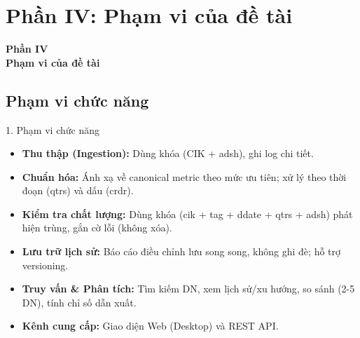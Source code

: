 \documentclass[t, aspectratio=169]{beamer} %
\begin{document}
	\useStyleLogoOnly 
	\useThickBar      
	
	\section{Phần IV: Phạm vi của đề tài}
	\begin{frame}
		\vfill
		\centering
		{\Huge \textbf{Phần IV}} \\[1em]
		{\huge \textbf{Phạm vi của đề tài}}
		\vfill
	\end{frame}
	
	\subsection{Phạm vi chức năng}
	\begin{frame}{1. Phạm vi chức năng}
		\begin{itemize}
			\item \textbf{Thu thập (Ingestion):} Dùng khóa (CIK + adsh), ghi log chi tiết.
			\item \textbf{Chuẩn hóa:} Ánh xạ về canonical metric theo mức ưu tiên; xử lý theo thời đoạn (qtrs) và dấu (crdr).
			\item \textbf{Kiểm tra chất lượng:} Dùng khóa (cik + tag + ddate + qtrs + adsh) phát hiện trùng, gắn cờ lỗi (không xóa).
			\item \textbf{Lưu trữ lịch sử:} Báo cáo điều chỉnh lưu song song, không ghi đè; hỗ trợ versioning.
			\item \textbf{Truy vấn \& Phân tích:} Tìm kiếm DN, xem lịch sử/xu hướng, so sánh (2-5 DN), tính chỉ số dẫn xuất.
			\item \textbf{Kênh cung cấp:} Giao diện Web (Desktop) và REST API.
		\end{itemize}
	\end{frame}
\end{document}
